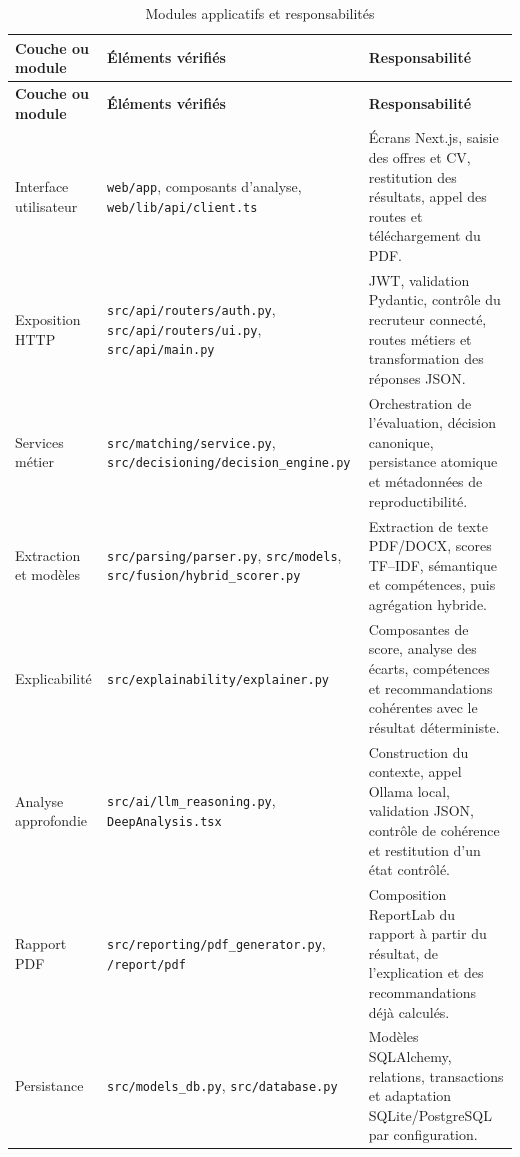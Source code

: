 {\scriptsize\setlength{\tabcolsep}{3pt}
\begin{longtable}{|>{\raggedright\arraybackslash}p{2.8cm}|>{\raggedright\arraybackslash}p{5.35cm}|>{\raggedright\arraybackslash}p{4.95cm}|}
\caption{Modules applicatifs et responsabilités}\label{tab:modules-jobtest}\\
\hline
\textbf{Couche ou module} & \textbf{Éléments vérifiés} & \textbf{Responsabilité}\\
\hline
\endfirsthead
\hline
\textbf{Couche ou module} & \textbf{Éléments vérifiés} & \textbf{Responsabilité}\\
\hline
\endhead
Interface utilisateur & \texttt{web/app}, composants d'analyse, \texttt{web/lib/api/client.ts} & Écrans Next.js, saisie des offres et CV, restitution des résultats, appel des routes et téléchargement du PDF.\\
\hline
Exposition HTTP & \texttt{src/api/routers/auth.py}, \texttt{src/api/routers/ui.py}, \texttt{src/api/main.py} & JWT, validation Pydantic, contrôle du recruteur connecté, routes métiers et transformation des réponses JSON.\\
\hline
Services métier & \texttt{src/matching/service.py}, \texttt{src/decisioning/decision\_engine.py} & Orchestration de l'évaluation, décision canonique, persistance atomique et métadonnées de reproductibilité.\\
\hline
Extraction et modèles & \texttt{src/parsing/parser.py}, \texttt{src/models}, \texttt{src/fusion/hybrid\_scorer.py} & Extraction de texte PDF/DOCX, scores TF--IDF, sémantique et compétences, puis agrégation hybride.\\
\hline
Explicabilité & \texttt{src/explainability/explainer.py} & Composantes de score, analyse des écarts, compétences et recommandations cohérentes avec le résultat déterministe.\\
\hline
Analyse approfondie & \texttt{src/ai/llm\_reasoning.py}, \texttt{DeepAnalysis.tsx} & Construction du contexte, appel Ollama local, validation JSON, contrôle de cohérence et restitution d'un état contrôlé.\\
\hline
Rapport PDF & \texttt{src/reporting/pdf\_generator.py}, \texttt{/report/pdf} & Composition ReportLab du rapport à partir du résultat, de l'explication et des recommandations déjà calculés.\\
\hline
Persistance & \texttt{src/models\_db.py}, \texttt{src/database.py} & Modèles SQLAlchemy, relations, transactions et adaptation SQLite/PostgreSQL par configuration.\\
\hline
\end{longtable}\par}
\normalsize

